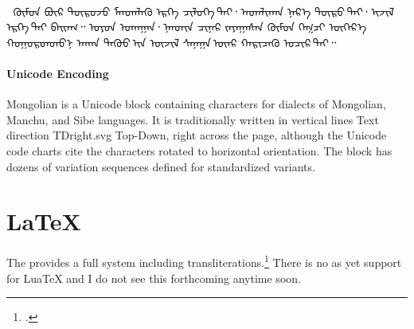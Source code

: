 \bgroup\par
\noindent
\colorbox{thecodebackground}{\color{black}^^A
\begin{minipage}{\textwidth}^^A
\parindent1pt
\vskip10pt
 \rightskip\leftskip
\mongolian
\Large
ᠬᠦᠮᠦᠨ ᠪᠦᠷ ᠲᠥᠷᠥᠵᠦ ᠮᠡᠨᠳᠡᠯᠡᠬᠦ ᠡᠷᠬᠡ ᠴᠢᠯᠥᠭᠡ ᠲᠡᠢ᠂ ᠠᠳᠠᠯᠢᠬᠠᠨ ᠨᠡᠷ᠎ᠡ ᠲᠥᠷᠥ ᠲᠡᠢ᠂ ᠢᠵᠢᠯ ᠡᠷᠬᠡ ᠲᠡᠢ ᠪᠠᠢᠠᠭ᠃ ᠣᠶᠤᠨ ᠤᠬᠠᠭᠠᠨ᠂ ᠨᠠᠨᠳᠢᠨ ᠴᠢᠨᠠᠷ ᠵᠠᠶᠠᠭᠠᠰᠠᠨ ᠬᠦᠮᠦᠨ ᠬᠡᠭᠴᠢ ᠥᠭᠡᠷ᠎ᠡ ᠬᠣᠭᠣᠷᠣᠨᠳᠣ᠎ᠨ ᠠᠬᠠᠨ ᠳᠡᠭᠦᠦ ᠢᠨ ᠦᠵᠢᠯ ᠰᠠᠨᠠᠭᠠ ᠥᠠᠷ ᠬᠠᠷᠢᠴᠠᠬᠥ ᠤᠴᠢᠷ ᠲᠠᠢ᠃
\par
\vspace*{10pt}
\end{minipage}
}
\medskip


\paragraph{Unicode Encoding} Mongolian is a Unicode block containing characters for dialects of Mongolian, Manchu, and Sibe languages. It is traditionally written in vertical lines Text direction TDright.svg Top-Down, right across the page, although the Unicode code charts cite the characters rotated to horizontal orientation.
The block has dozens of variation sequences defined for standardized variants.
\bigskip


\bigskip

\section{LaTeX}

The  provides a full system including transliterations.\footcite{montex} There is no as yet support for LuaTeX and I do not see this forthcoming anytime soon. 










